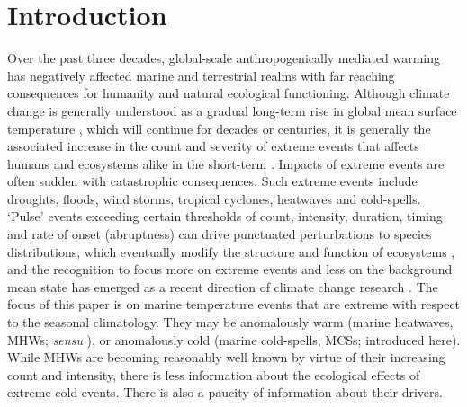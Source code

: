 \documentclass[a4paper,10pt,review]{elsarticle}
\begin{document}
\linenumbers

\section{Introduction}

Over the past three decades, global-scale anthropogenically mediated warming has negatively affected marine and terrestrial realms with far reaching consequences for humanity and natural ecological functioning. Although climate change is generally understood as a gradual long-term rise in global mean surface temperature \citep{IPCC2014}, which will continue for decades or centuries, it is generally the associated increase in the count and severity of extreme events that affects humans and ecosystems alike in the short-term \citep{Easterling2000}. Impacts of extreme events are often sudden with catastrophic consequences. Such extreme events include droughts, floods, wind storms, tropical cyclones, heatwaves and cold-spells. `Pulse' events exceeding certain thresholds of count, intensity, duration, timing and rate of onset (abruptness) can drive punctuated perturbations to species distributions, which eventually modify the structure and function of ecosystems \citep{Wernberg2013, Rehage2016}, and the recognition to focus more on extreme events and less on the background mean state has emerged as a recent direction of climate change research \citep{Jentsch2007}. The focus of this paper is on marine temperature events that are extreme with respect to the seasonal climatology. They may be anomalously warm (marine heatwaves, MHWs; \emph{sensu} \citet{Hobday2016}), or anomalously cold (marine cold-spells, MCSs; introduced here). While MHWs are becoming reasonably well known by virtue of their increasing count and intensity, there is less information about the ecological effects of extreme cold events. There is also a paucity of information about their drivers.
\end{document}
